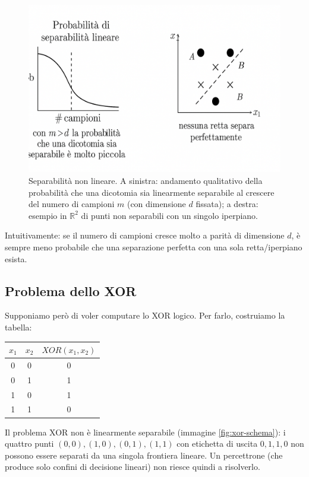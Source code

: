 \begin{figure}[htbp]
	\centering
	\includegraphics[width=0.7\linewidth]{images/non_linear_separation-probability.png}
	\caption{Separabilità non lineare. A sinistra: andamento qualitativo della probabilità che una dicotomia sia linearmente separabile al crescere del numero di campioni \(m\) (con dimensione \(d\) fissata); a destra: esempio in \(\mathbb{R}^2\) di punti non separabili con un singolo iperpiano.}
	\label{fig:nonlinear-separability}
\end{figure}

Intuitivamente: se il numero di campioni cresce molto a parità di dimensione $d$, è sempre meno probabile che una separazione perfetta con una sola retta/iperpiano esista.

\subsection{Problema dello XOR}
Supponiamo però di voler computare lo XOR logico. Per farlo, costruiamo la tabella: 
\begin{center}
	\begin{tabular}{|c|c|c|}
		\hline
		\(x_1\) & \(x_2\) & \(XOR(x_1,x_2)\)\\
		\hline
		0 & 0 & 0\\
		0 & 1 & 1\\
		1 & 0 & 1\\
		1 & 1 & 0\\
		\hline
	\end{tabular}
\end{center}

\noindent
Il problema XOR non è linearmente separabile (immagine \ref{fig:xor-schema}): i quattro punti \((0,0),(1,0),(0,1),(1,1)\) con etichetta di uscita \(0,1,1,0\) non possono essere separati da una singola frontiera lineare. Un percettrone (che produce solo confini di decisione lineari) non riesce quindi a risolverlo.

